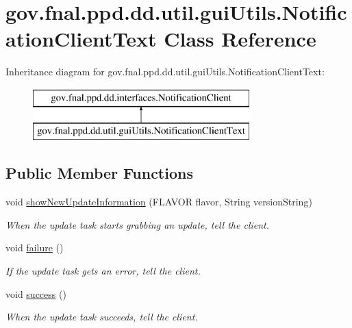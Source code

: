 \hypertarget{classgov_1_1fnal_1_1ppd_1_1dd_1_1util_1_1guiUtils_1_1NotificationClientText}{\section{gov.\-fnal.\-ppd.\-dd.\-util.\-gui\-Utils.\-Notification\-Client\-Text Class Reference}
\label{classgov_1_1fnal_1_1ppd_1_1dd_1_1util_1_1guiUtils_1_1NotificationClientText}
}
Inheritance diagram for gov.\-fnal.\-ppd.\-dd.\-util.\-gui\-Utils.\-Notification\-Client\-Text\-:\begin{figure}[H]
\begin{center}
\leavevmode
\includegraphics[height=2.000000cm]{classgov_1_1fnal_1_1ppd_1_1dd_1_1util_1_1guiUtils_1_1NotificationClientText}
\end{center}
\end{figure}
\subsection*{Public Member Functions}
\begin{DoxyCompactItemize}
\item 
void \hyperlink{classgov_1_1fnal_1_1ppd_1_1dd_1_1util_1_1guiUtils_1_1NotificationClientText_ab4879ecf03b2d00f8d4e085c8bd41f0a}{show\-New\-Update\-Information} (F\-L\-A\-V\-O\-R flavor, String version\-String)
\begin{DoxyCompactList}\small\item\em When the update task starts grabbing an update, tell the client. \end{DoxyCompactList}\item 
void \hyperlink{classgov_1_1fnal_1_1ppd_1_1dd_1_1util_1_1guiUtils_1_1NotificationClientText_a60f0c1ad444844a27c015753fd23f54a}{failure} ()
\begin{DoxyCompactList}\small\item\em If the update task gets an error, tell the client. \end{DoxyCompactList}\item 
void \hyperlink{classgov_1_1fnal_1_1ppd_1_1dd_1_1util_1_1guiUtils_1_1NotificationClientText_a8de8c375474d901a6554bd3c39d4cf46}{success} ()
\begin{DoxyCompactList}\small\item\em When the update task succeeds, tell the client. \end{DoxyCompactList}\end{DoxyCompactItemize}


